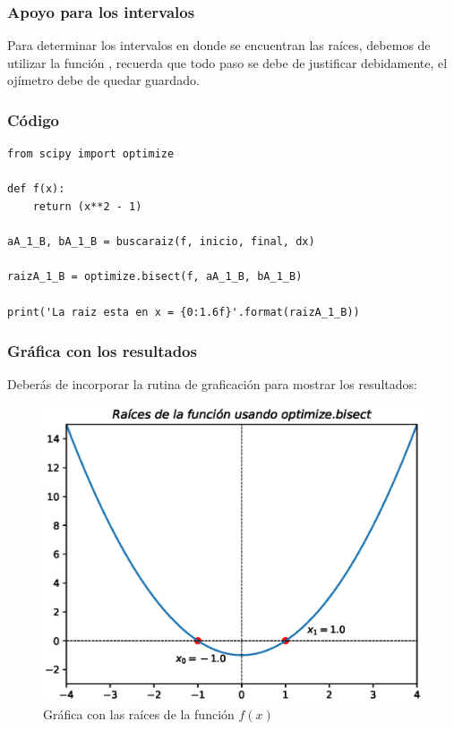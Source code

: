\begin{frame}
\frametitle{Apoyo para los intervalos}
Para determinar los intervalos en donde se encuentran las raíces, debemos de utilizar la función , recuerda que todo paso se debe de justificar debidamente, el ojímetro debe de quedar guardado.
\end{frame}
\begin{frame}
\frametitle{Código}
\begin{lstlisting}[caption=Código para el cálculo de la raíz con \texttt{optimize.bisect}, style=codigopython]
from scipy import optimize

def f(x):
    return (x**2 - 1)

aA_1_B, bA_1_B = buscaraiz(f, inicio, final, dx)

raizA_1_B = optimize.bisect(f, aA_1_B, bA_1_B)

print('La raiz esta en x = {0:1.6f}'.format(raizA_1_B))
\end{lstlisting}
\end{frame}
\begin{frame}
\frametitle{Gráfica con los resultados}
Deberás de incorporar la rutina de graficación para mostrar los resultados:
\begin{figure}[h!]
    \centering
    \includegraphics[scale=0.4]{Imagenes/raices_scipy_bisect_02.eps}
    \caption{Gráfica con las raíces de la función $f(x)$}
\end{figure}
\end{frame}
